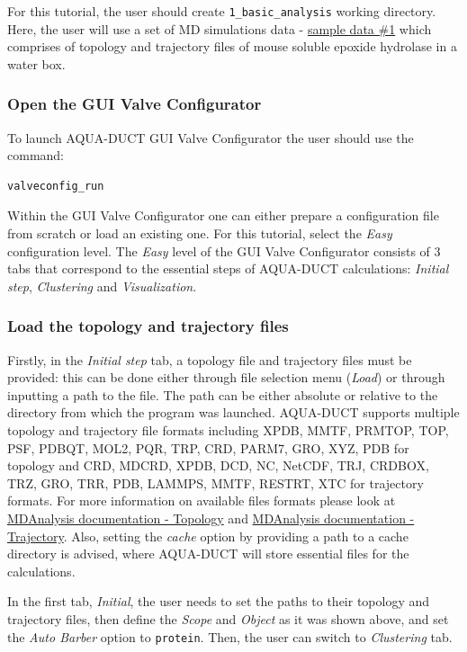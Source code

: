 \documentclass[9pt,tutorial, pubversion]{livecoms}
\begin{document}
For this tutorial, the user should create \texttt{1\_basic\_analysis} working directory. Here, the user will use a set of MD simulations data
- \href{http://www.aquaduct.pl/sample-data/}{sample data \#1} which comprises of topology and trajectory files of mouse soluble epoxide hydrolase in a water box.

\subsubsection{Open the GUI Valve Configurator}
To launch AQUA-DUCT GUI Valve Configurator the user should use the command:
\begin{lstlisting}
valveconfig_run
\end{lstlisting}
Within the GUI Valve Configurator one can either prepare a configuration file from scratch or load an existing one. 
For this tutorial, select the \textit{Easy} configuration level. The \textit{Easy} level of the GUI Valve Configurator consists of 3 tabs that correspond to the essential steps of AQUA-DUCT calculations: \textit{Initial step}, \textit{Clustering} and \textit{Visualization}.

\subsubsection{Load the topology and trajectory files}
Firstly, in the \textit{Initial step} tab, a topology file and trajectory files must be provided: this can be done either through file selection menu (\textit{Load}) or through inputting a path to the file. The path can be either absolute or relative to the directory from which the program was launched. AQUA-DUCT supports multiple topology and trajectory file formats including XPDB, MMTF, PRMTOP, TOP, PSF, PDBQT, MOL2, PQR, TRP, CRD, PARM7, GRO, XYZ, PDB for topology and CRD, MDCRD, XPDB, DCD, NC, NetCDF, TRJ, CRDBOX, TRZ, GRO, TRR, PDB, LAMMPS, MMTF, RESTRT, XTC for trajectory formats. For more information on available files formats please look at \href{https://www.mdanalysis.org/docs/documentation_pages/topology/init.html}{MDAnalysis documentation - Topology} and \href{https://www.mdanalysis.org/docs/documentation_pages/coordinates/init.html}{MDAnalysis documentation - Trajectory}. Also, setting the \textit{cache} option by providing a path to a cache directory is advised, where AQUA-DUCT will store essential files for the calculations.

In the first tab, \textit{Initial}, the user needs to set the paths to their topology and trajectory files, then define the \emph{Scope} and \emph{Object} as it was shown above, and set the \textit{Auto Barber} option to \texttt{protein}. Then, the user can switch to \textit{Clustering} tab.
\end{document}
